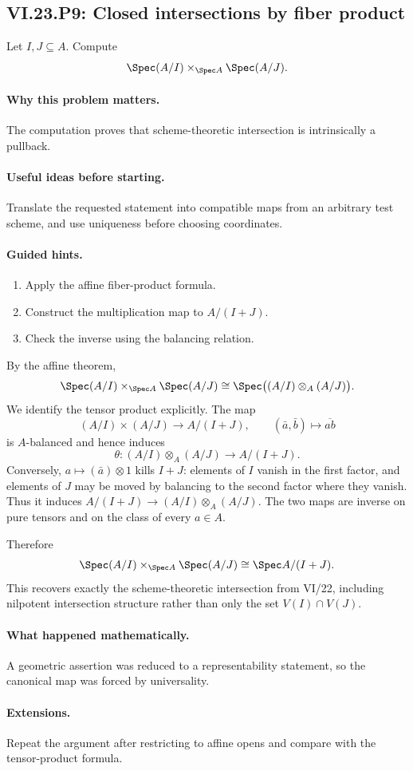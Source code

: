 \subsection*{VI.23.P9: Closed intersections by fiber product}
\begin{problem}\label{prob:vi23-p09}
Let $I,J\subseteq A$. Compute
\[
\Spec(A/I)\times_{\Spec A}\Spec(A/J).
\]
\end{problem}

\ifdefined\FullProblemDossiers
\paragraph{Why this problem matters.}
The computation proves that scheme-theoretic intersection is intrinsically a pullback.

\paragraph{Useful ideas before starting.}
Translate the requested statement into compatible maps from an arbitrary test scheme, and use uniqueness before choosing coordinates.

\paragraph{Guided hints.}
\begin{enumerate}
\item Apply the affine fiber-product formula.
\item Construct the multiplication map to $A/(I+J)$.
\item Check the inverse using the balancing relation.
\end{enumerate}

\begin{solution}
By the affine theorem,
\[
\Spec(A/I)\times_{\Spec A}\Spec(A/J)
\cong
\Spec\bigl((A/I)\otimes_A(A/J)\bigr).
\]
We identify the tensor product explicitly.  The map
\[
(A/I)\times(A/J)\to A/(I+J),\qquad
(\bar a,\bar b)\mapsto \overline{ab}
\]
is $A$-balanced and hence induces
\[
\theta:(A/I)\otimes_A(A/J)\to A/(I+J).
\]
Conversely, $a\mapsto(\bar a)\otimes1$ kills $I+J$: elements of $I$ vanish in the first factor,
and elements of $J$ may be moved by balancing to the second factor where they vanish.  Thus it
induces $A/(I+J)\to(A/I)\otimes_A(A/J)$.  The two maps are inverse on pure tensors and on the
class of every $a\in A$.

Therefore
\[
\Spec(A/I)\times_{\Spec A}\Spec(A/J)\cong\Spec A/(I+J).
\]
This recovers exactly the scheme-theoretic intersection from VI/22, including nilpotent
intersection structure rather than only the set $V(I)\cap V(J)$.
\end{solution}

\paragraph{What happened mathematically.}
A geometric assertion was reduced to a representability statement, so the canonical map was forced by universality.

\paragraph{Extensions.}
Repeat the argument after restricting to affine opens and compare with the tensor-product formula.
\fi
